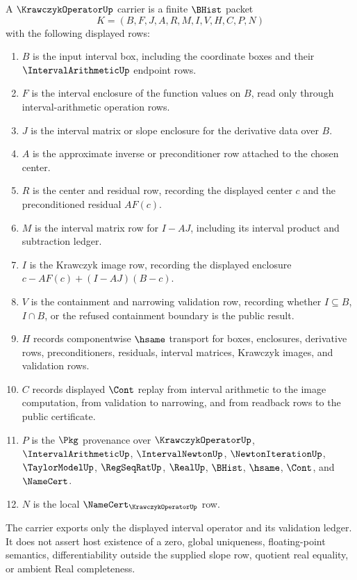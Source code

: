 \begin{definition}
\label{def:krawczyk-operator-carrier}
A $\KrawczykOperatorUp$ carrier is a finite $\BHist$ packet
$$
K=(B,F,J,A,R,M,I,V,H,C,P,N)
$$
with the following displayed rows:
\begin{enumerate}
\item $B$ is the input interval box, including the coordinate boxes and their $\IntervalArithmeticUp$ endpoint rows.
\item $F$ is the interval enclosure of the function values on $B$, read only through interval-arithmetic operation rows.
\item $J$ is the interval matrix or slope enclosure for the derivative data over $B$.
\item $A$ is the approximate inverse or preconditioner row attached to the chosen center.
\item $R$ is the center and residual row, recording the displayed center $c$ and the preconditioned residual $A F(c)$.
\item $M$ is the interval matrix row for $I-AJ$, including its interval product and subtraction ledger.
\item $I$ is the Krawczyk image row, recording the displayed enclosure $c-AF(c)+(I-AJ)(B-c)$.
\item $V$ is the containment and narrowing validation row, recording whether $I \subseteq B$, $I \cap B$, or the refused containment boundary is the public result.
\item $H$ records componentwise $\hsame$ transport for boxes, enclosures, derivative rows, preconditioners, residuals, interval matrices, Krawczyk images, and validation rows.
\item $C$ records displayed $\Cont$ replay from interval arithmetic to the image computation, from validation to narrowing, and from readback rows to the public certificate.
\item $P$ is the $\Pkg$ provenance over $\KrawczykOperatorUp$, $\IntervalArithmeticUp$, $\IntervalNewtonUp$, $\NewtonIterationUp$, $\TaylorModelUp$, $\RegSeqRatUp$, $\RealUp$, $\BHist$, $\hsame$, $\Cont$, and $\NameCert$.
\item $N$ is the local $\NameCert_{\KrawczykOperatorUp}$ row.
\end{enumerate}
The carrier exports only the displayed interval operator and its validation ledger. It does not assert host existence of a zero, global uniqueness, floating-point semantics, differentiability outside the supplied slope row, quotient real equality, or ambient Real completeness.
\end{definition}

